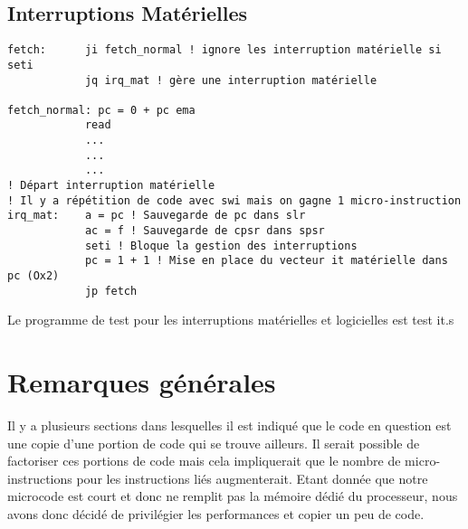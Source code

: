 \documentclass{myArticle}
\begin{document}
\subsection{Interruptions Matérielles}
\begin{lstlisting}
fetch:      ji fetch_normal ! ignore les interruption matérielle si seti
            jq irq_mat ! gère une interruption matérielle

fetch_normal: pc = 0 + pc ema
            read
            ...
            ...
            ...
! Départ interruption matérielle
! Il y a répétition de code avec swi mais on gagne 1 micro-instruction
irq_mat:    a = pc ! Sauvegarde de pc dans slr
            ac = f ! Sauvegarde de cpsr dans spsr
            seti ! Bloque la gestion des interruptions
            pc = 1 + 1 ! Mise en place du vecteur it matérielle dans pc (Ox2)
            jp fetch
\end{lstlisting}

Le programme de test pour les interruptions matérielles et logicielles est test it.s

\section{Remarques générales}
Il y a plusieurs sections dans lesquelles il est indiqué que le code en question est une copie d'une
portion de code qui se trouve ailleurs. Il serait possible de factoriser ces portions de code mais
cela impliquerait que le nombre de micro-instructions pour les instructions liés augmenterait. Etant
donnée que notre microcode est court et donc ne remplit pas la mémoire dédié du processeur, nous
avons donc décidé de privilégier les performances et copier un peu de code.
\end{document}
